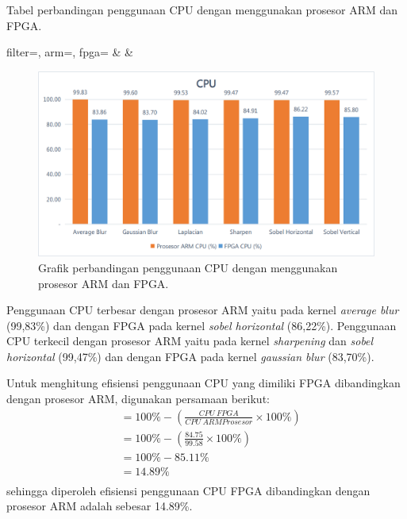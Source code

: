 \begin{atable}
    \caption{Tabel perbandingan penggunaan CPU dengan menggunakan prosesor ARM dan FPGA.}
    \label{table:hasil-cpu}
        {
            filter=\filter, 
            arm=\arm, 
            fpga=\fpga}
        {
            \filter & 
            \arm & 
            \fpga }
\end{atable}

\begin{figure}[H]
    \includegraphics[width=0.81\linewidth, center]{images/chart/chart-cpu.png}
    \caption{Grafik perbandingan penggunaan CPU dengan menggunakan prosesor ARM dan FPGA.}
    \label{fig:chart-cpu}
\end{figure}

Penggunaan CPU terbesar dengan prosesor ARM yaitu pada kernel \textit{average blur} (99,83\%) dan dengan FPGA pada kernel \textit{sobel horizontal} (86,22\%). Penggunaan CPU terkecil dengan prosesor ARM yaitu pada kernel \textit{sharpening} dan \textit{sobel horizontal} (99,47\%) dan dengan FPGA pada kernel \textit{gaussian blur} (83,70\%).

Untuk menghitung efisiensi penggunaan CPU yang dimiliki FPGA dibandingkan dengan prosesor ARM, digunakan persamaan berikut:
\begin{equation*}
    \begin{split}
& = 100\% - \left( \frac{CPU\ FPGA}{CPU\ ARM Prosesor} \times 100\% \right) \\
& = 100\% - \left( \frac{84.75}{99.58} \times 100\% \right) \\
& = 100\% - 85.11\% \\
& = 14.89\% \\
    \end{split}
\end{equation*}
sehingga diperoleh efisiensi penggunaan CPU FPGA dibandingkan dengan prosesor ARM adalah sebesar 14.89\%.

